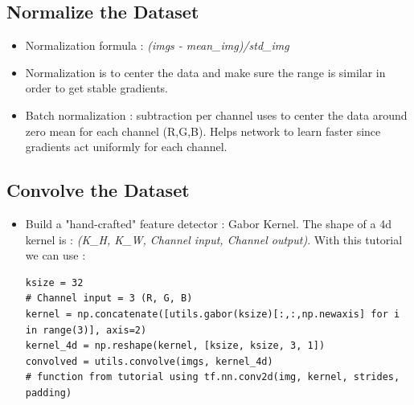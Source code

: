 \documentclass[12pt,a4paper]{article}
\begin{document}
\subsection{Normalize the Dataset}
\begin{itemize}
\item Normalization formula : \textit{(imgs - mean\_img)/std\_img}
\item Normalization is to center the data and make sure the range is similar in order to get stable gradients.
\item Batch normalization : subtraction per channel uses to center the data around zero mean for each channel (R,G,B). Helps network to learn faster since gradients act uniformly for each channel.
\end{itemize}
\subsection{Convolve the Dataset}
\begin{itemize}
\item Build a "hand-crafted" feature detector : Gabor Kernel. The shape of a 4d kernel is : \textit{(K\_H, K\_W, Channel input, Channel output)}. With this tutorial we can use :
\begin{lstlisting}
ksize = 32
# Channel input = 3 (R, G, B)
kernel = np.concatenate([utils.gabor(ksize)[:,:,np.newaxis] for i in range(3)], axis=2)
kernel_4d = np.reshape(kernel, [ksize, ksize, 3, 1])
convolved = utils.convolve(imgs, kernel_4d)
# function from tutorial using tf.nn.conv2d(img, kernel, strides, padding) 
\end{lstlisting}
\end{itemize}
\end{document}
